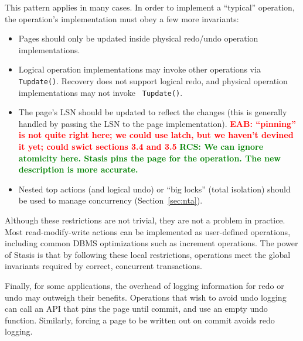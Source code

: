 \documentclass[letterpaper,twocolumn,10pt]{article}
\newcommand{\yad}{Stasis\xspace}
\newcommand{\eab}[1]{\textcolor{red}{\bf EAB: #1}}
\newcommand{\rcs}[1]{\textcolor{green}{\bf RCS: #1}}
\newcommand{\eat}[1]{}
\begin{document}
This pattern applies in many cases.  In
order to implement a ``typical'' operation, the operation's
implementation must obey a few more invariants:
\begin{itemize}
\item Pages should only be updated inside physical redo/undo operation implementations.
\item Logical operation implementations may invoke other operations
      via {\tt Tupdate()}.  Recovery does not support logical redo,
      and physical operation implementations may not invoke {\tt
      Tupdate()}.
\item The page's LSN should be updated to reflect the changes (this is
      generally handled by passing the LSN to the page implementation).
\eab{``pinning'' is not quite right here; we could use latch, but we
haven't devined it yet; could swict sections 3.4 and 3.5} \rcs{We can
ignore atomicity here. \yad pins the page for the operation.  The new description is more accurate.}

\item Nested top actions (and logical undo) or ``big locks'' (total isolation) should be used to manage concurrency (Section~\ref{sec:nta}).
\end{itemize}

Although these restrictions are not trivial, they are not a problem in
practice. Most read-modify-write actions can be implemented as
user-defined operations, including common DBMS optimizations such as
increment operations.  The power of \yad is that by following these
local restrictions, operations meet the global
invariants required by correct, concurrent transactions.

Finally, for some applications, the overhead of logging information for redo or
undo may outweigh their benefits.  Operations that wish to avoid undo
logging can call an API that pins the page until commit, and use an
empty undo function.  Similarly, forcing a page
to be written out on commit avoids redo logging.


\eat{
Note that we could implement a limited form of transactions by
limiting each transaction to a single operation, and by forcing the
page that each operation updates to disk in order.  If we ignore torn
pages and failed sectors, this does not require any sort of logging,
but is quite inefficient in practice, as it forces the disk to perform
a potentially random write each time the page file is updated.

The rest of this section describes how recovery can be extended,
first to support multiple operations per transaction efficiently, and
then to allow more than one transaction to modify the same data before
committing.
}
\end{document}
